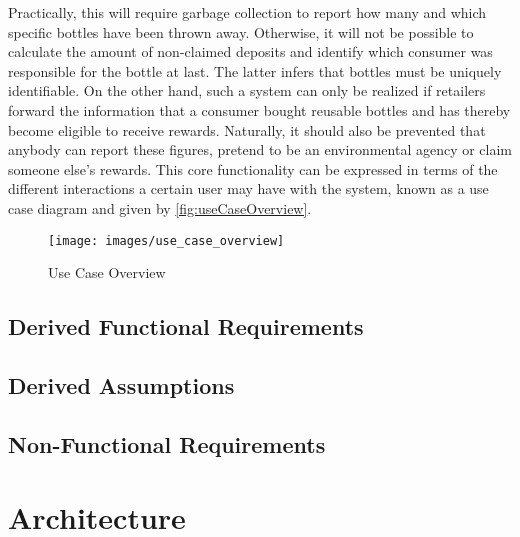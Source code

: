 Practically, this will require garbage collection to report how many and which specific bottles have been thrown away. Otherwise, it will not be possible to calculate the amount of non-claimed deposits and identify which consumer was responsible for the bottle at last. The latter infers that bottles must be uniquely identifiable. On the other hand, such a system can only be realized if retailers forward the information that a consumer bought reusable bottles and has thereby become eligible to receive rewards. Naturally, it should also be prevented that anybody can report these figures, pretend to be an environmental agency or claim someone else's rewards. This core functionality can be expressed in terms of the different interactions a certain user may have with the system, known as a use case diagram and given by \autoref{fig:useCaseOverview}.

\begin{figure}[hbt]
  \texttt{[image: images/use\_case\_overview]}
  \caption{Use Case Overview}
  \label{fig:useCaseOverview}
\end{figure}

\FloatBarrier








	
\subsection{Derived Functional Requirements}
	
\subsection{Derived Assumptions}

\subsection{Non-Functional Requirements}
	



\section{Architecture}

